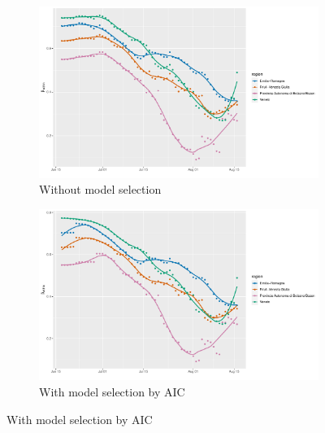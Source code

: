 \documentclass[12pt]{article}
\begin{document}
	\begin{figure}[H]
	    \centering
	    \begin{subfigure}{\textwidth}
	      \centering
	      \includegraphics[width=0.95\linewidth]{output/model_within_lag14_betawithin_Nord-Est_rolling.pdf}
	      \caption{Without model selection}
	      \label{fig:beta_within_over_time_nordest_regular}
	    \end{subfigure}\newline
	    \begin{subfigure}{\textwidth}
	      \centering
	      \includegraphics[width=0.95\linewidth]{output/model_within_lag14_betawithin_Nord-Est_aic_rolling.pdf}
	      \caption{With model selection by AIC}
	      \label{fig:beta_within_over_time_nordest_aic}
	    \end{subfigure}
	\end{figure}
\end{document}
